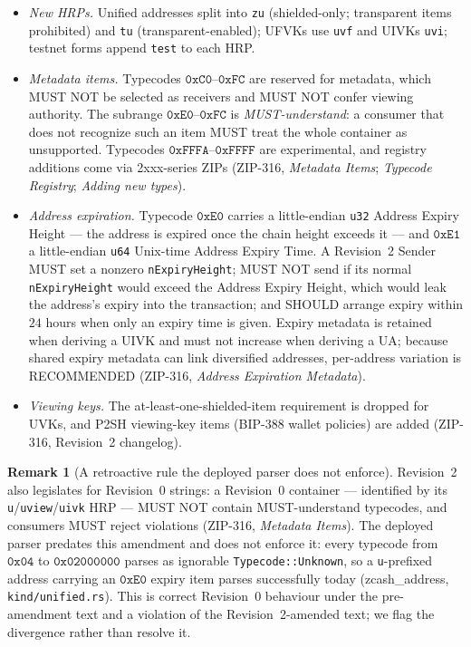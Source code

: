 \documentclass[11pt,a4paper]{article}
\theoremstyle{definition}
\newtheorem{remark}[theorem]{Remark}
\begin{document}
\begin{itemize}[leftmargin=*]
\item \emph{New HRPs.} Unified addresses split into \texttt{zu}
(shielded-only; transparent items prohibited) and \texttt{tu}
(transparent-enabled); UFVKs use \texttt{uvf} and UIVKs \texttt{uvi};
testnet forms append \texttt{test} to each HRP.
\item \emph{Metadata items.} Typecodes $\mathtt{0xC0}$--$\mathtt{0xFC}$
are reserved for metadata, which MUST NOT be selected as receivers and
MUST NOT confer viewing authority. The subrange
$\mathtt{0xE0}$--$\mathtt{0xFC}$ is \emph{MUST-understand}: a consumer
that does not recognize such an item MUST treat the whole container as
unsupported. Typecodes $\mathtt{0xFFFA}$--$\mathtt{0xFFFF}$ are
experimental, and registry additions come via 2xxx-series ZIPs (ZIP-316,
\emph{Metadata Items}; \emph{Typecode Registry}; \emph{Adding new
types}).
\item \emph{Address expiration.} Typecode $\mathtt{0xE0}$ carries a
little-endian \texttt{u32} Address Expiry Height --- the address is
expired once the chain height exceeds it --- and $\mathtt{0xE1}$ a
little-endian \texttt{u64} Unix-time Address Expiry Time. A Revision~2
Sender MUST set a nonzero \texttt{nExpiryHeight}; MUST NOT send if its
normal \texttt{nExpiryHeight} would exceed the Address Expiry Height,
which would leak the address's expiry into the transaction; and SHOULD
arrange expiry within $24$ hours when only an expiry time is given.
Expiry metadata is retained when deriving a UIVK and must not increase
when deriving a UA; because shared expiry metadata can link diversified
addresses, per-address variation is RECOMMENDED (ZIP-316, \emph{Address
Expiration Metadata}).
\item \emph{Viewing keys.} The at-least-one-shielded-item requirement is
dropped for UVKs, and P2SH viewing-key items (BIP-388 wallet policies)
are added (ZIP-316, Revision~2 changelog).
\end{itemize}

\begin{remark}[A retroactive rule the deployed parser does not enforce]\label{rem:r0-mustunderstand}
Revision~2 also legislates for Revision~0 strings: a Revision~0 container
--- identified by its \texttt{u}/\texttt{uview}/\texttt{uivk} HRP --- MUST
NOT contain MUST-understand typecodes, and consumers MUST reject
violations (ZIP-316, \emph{Metadata Items}). The deployed parser predates
this amendment and does not enforce it: every typecode from
$\mathtt{0x04}$ to $\mathtt{0x02000000}$ parses as ignorable
\texttt{Typecode::Unknown}, so a \texttt{u}-prefixed address carrying an
$\mathtt{0xE0}$ expiry item parses successfully today
(\textsf{zcash\_address}, \texttt{kind/unified.rs}). This is correct
Revision~0 behaviour under the pre-amendment text and a violation of the
Revision~2-amended text; we flag the divergence rather than resolve it.
\end{remark}
\end{document}

